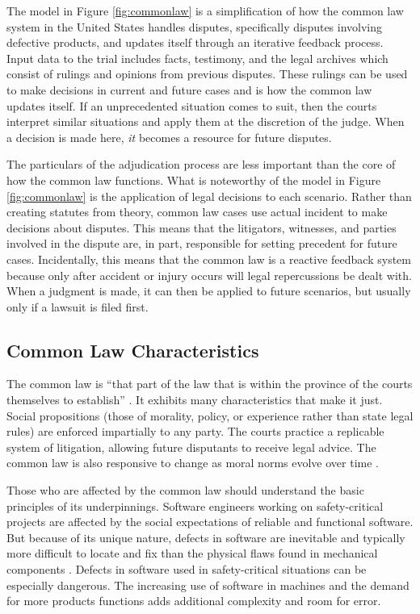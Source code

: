 \documentclass[12pt]{report}
\begin{document}
The model in Figure \ref{fig:commonlaw} is a simplification of how the common law system in the United States handles disputes, specifically disputes involving defective products, and updates itself through an iterative feedback process. Input data to the trial includes facts, testimony, and the legal archives which consist of rulings and opinions from previous disputes. These rulings can be used to make decisions in current and future cases and is how the common law updates itself. If an unprecedented situation comes to suit, then the courts interpret similar situations and apply them at the discretion of the judge. When a decision is made here, \textit{it} becomes a resource for future disputes.

The particulars of the adjudication process are less important than the core of how the common law functions. What is noteworthy of the model in Figure \ref{fig:commonlaw} is the application of legal decisions to each scenario. Rather than creating statutes from theory, common law cases use actual incident to make decisions about disputes. This means that the litigators, witnesses, and parties involved in the dispute are, in part, responsible for setting precedent for future cases. Incidentally, this means that the common law is a reactive feedback system because only after accident or injury occurs will legal repercussions be dealt with. When a judgment is made, it can then be applied to future scenarios, but usually only if a lawsuit is filed first. 

\subsection{Common Law Characteristics} 

The common law is ``that part of the law that is within the province of the courts themselves to establish'' \cite{FAKE}. It exhibits many characteristics that make it just. Social propositions (those of morality, policy, or experience rather than state legal rules) are enforced impartially to any party. The courts practice a replicable system of litigation, allowing future disputants to receive legal advice. The common law is also responsive to change as moral norms evolve over time \cite{FAKE}. 

Those who are affected by the common law should understand the basic principles of its underpinnings. Software engineers working on safety-critical projects are affected by the social expectations of reliable and functional software. But because of its unique nature, defects in software are inevitable and typically more difficult to locate and fix than the physical flaws found in mechanical components \cite{FAKE}. Defects in software used in safety-critical situations can be especially dangerous. The increasing use of software in machines and the demand for more products functions adds additional complexity and room for error.
\end{document}
